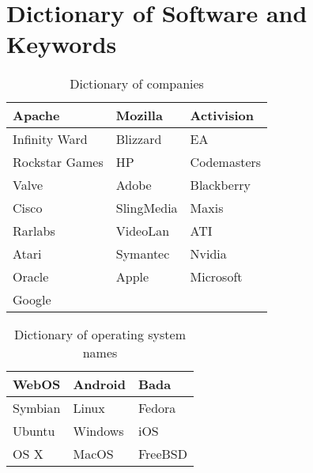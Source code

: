 \chapter{Dictionary of Software and Keywords}
\label{app:dictionary}

\begin{table}[h]
\begin{center}
\begin{tabular}{|l|l|l|}\hline
Apache&Mozilla&Activision\\\hline
Infinity Ward&Blizzard&EA\\\hline
Rockstar Games&HP&Codemasters\\\hline
Valve&Adobe&Blackberry\\\hline
Cisco&SlingMedia&Maxis\\\hline
Rarlabs&VideoLan&ATI\\\hline
Atari&Symantec&Nvidia\\\hline
Oracle&Apple&Microsoft\\\hline
Google&&\\\hline
\end{tabular}
\end{center}
\caption{Dictionary of companies}
\end{table}

\begin{table}[h]
\begin{center}
\begin{tabular}{|l|l|l|}\hline
WebOS&Android&Bada\\\hline
Symbian&Linux&Fedora\\\hline
Ubuntu&Windows&iOS\\\hline
OS X&MacOS&FreeBSD\\\hline
\end{tabular}
\end{center}
\caption{Dictionary of operating system names}
\end{table}

